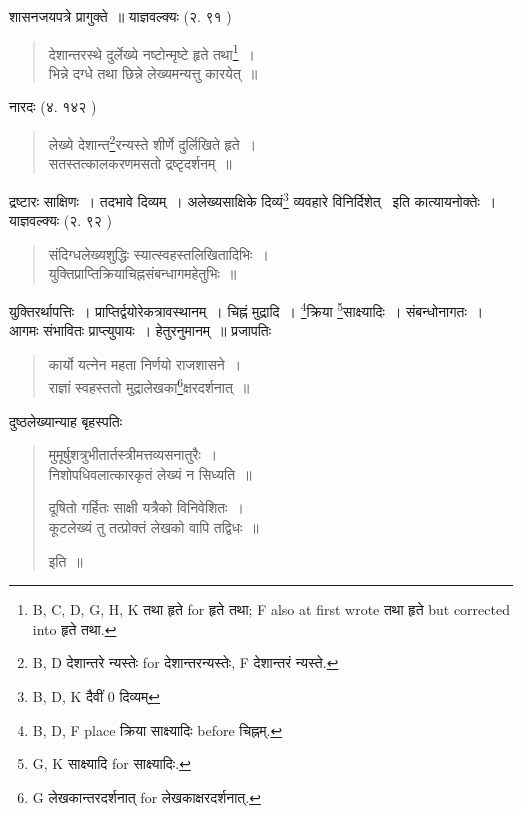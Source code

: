 \documentclass[11pt, openany]{book}
\begin{document}
शासनजयपत्रे प्रागुक्ते~॥ याज्ञवल्क्यः (२. ९१ )

\begin{quote}
{\vy देशान्तरस्थे दुर्लेख्ये नष्टोन्मृष्टे हृते तथा\renewcommand{\thefootnote}{3}\footnote{B, C, D, G, H, K तथा हृते for हृते तथा; F also at first wrote तथा हृते but corrected into हृते तथा.}~।\\
भिन्ने दग्धे तथा छिन्ने लेख्यमन्यत्तु कारयेत्~॥}
\end{quote}

नारदः (४. १४२ )

\begin{quote}
{\vy लेख्ये देशान्त\renewcommand{\thefootnote}{4}\footnote{B, D देशान्तरे न्यस्तेः for देशान्तरन्यस्तेः, F देशान्तरं न्यस्ते.}रन्यस्ते शीर्णे दुर्लिखिते हृते~।\\
सतस्तत्कालकरणमसतो द्रष्टृदर्शनम्~॥}
\end{quote}

द्रष्टारः साक्षिणः~। तदभावे दिव्यम्~। अलेख्यसाक्षिके दिव्यं\renewcommand{\thefootnote}{5}\footnote{B, D, K दैवीं 0 दिव्यम्} व्यवहारे विनिर्दिशेत् \textendash\ इति कात्यायनोक्तेः~। याज्ञवल्क्यः (२. ९२ )

\begin{quote}
{\vy संदिग्धलेख्यशुद्धिः स्यात्स्वहस्तलिखितादिभिः~।\\
युक्तिप्राप्तिक्रियाचिह्नसंबन्धागमहेतुभिः~॥}
\end{quote}

युक्तिरर्थापत्तिः~। प्राप्तिर्द्वयोरेकत्रावस्थानम्~। चिह्नं मुद्रादि~। \renewcommand{\thefootnote}{6}\footnote{B, D, F place क्रिया साक्ष्यादिः before चिह्नम्.}क्रिया \renewcommand{\thefootnote}{7}\footnote{G, K साक्ष्यादि for साक्ष्यादिः.}साक्ष्यादिः~। संबन्धोनागतः~। आगमः संभावितः प्राप्त्युपायः~। हेतुरनुमानम्~॥ प्रजापतिः 

\newpage
{}

\begin{quote}
{\vy कार्यो यत्नेन महता निर्णयो राजशासने~।\\
राज्ञां स्वहस्ततो मुद्रालेखका\renewcommand{\thefootnote}{1}\footnote{G लेखकान्तरदर्शनात् for लेखकाक्षरदर्शनात्.}क्षरदर्शनात्~॥}
\end{quote}

दुष्ठलेख्यान्याह बृहस्पतिः 

\begin{quote}
{\vy मुमूर्षुशत्रुभीतार्तस्त्रीमत्तव्यसनातुरैः~।\\
निशोपधिवलात्कारकृतं लेख्यं न सिध्यति~॥

दूषितो गर्हितः साक्षी यत्रैको विनिवेशितः~।\\
कूटलेख्यं तु तत्प्रोक्तं लेखको वापि तद्विधः~॥} इति~॥
\end{quote}
\end{document}
